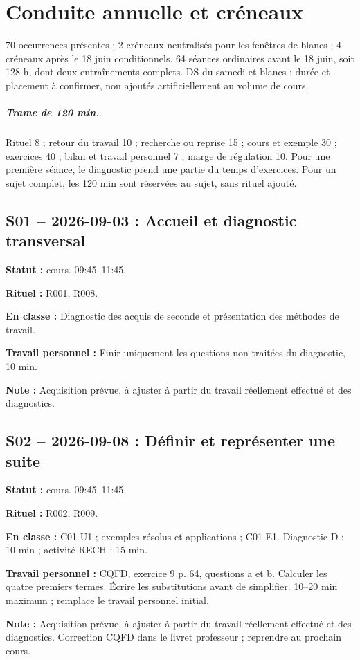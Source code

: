 \chapter{Conduite annuelle et créneaux}\label{ANNUEL}
70 occurrences présentes ; 2 créneaux neutralisés pour les fenêtres de blancs ; 4 créneaux après le 18 juin conditionnels. 64 séances ordinaires avant le 18 juin, soit 128 h, dont deux entraînements complets. DS du samedi et blancs : durée et placement à confirmer, non ajoutés artificiellement au volume de cours.
\paragraph{Trame de 120 min.} Rituel 8 ; retour du travail 10 ; recherche ou reprise 15 ; cours et exemple 30 ; exercices 40 ; bilan et travail personnel 7 ; marge de régulation 10. Pour une première séance, le diagnostic prend une partie du temps d’exercices. Pour un sujet complet, les 120 min sont réservées au sujet, sans rituel ajouté.
\section*{S01 -- 2026-09-03 : Accueil et diagnostic transversal}
\textbf{Statut :} cours. 09:45–11:45.\par\textbf{Rituel :} R001, R008.\par\textbf{En classe :} Diagnostic des acquis de seconde et présentation des méthodes de travail.\par\textbf{Travail personnel :} Finir uniquement les questions non traitées du diagnostic, 10 min.\par\textbf{Note :} Acquisition prévue, à ajuster à partir du travail réellement effectué et des diagnostics.
\section*{S02 -- 2026-09-08 : Définir et représenter une suite}
\textbf{Statut :} cours. 09:45–11:45.\par\textbf{Rituel :} R002, R009.\par\textbf{En classe :} C01-U1 ; exemples résolus et applications ; C01-E1. Diagnostic D : 10 min ; activité RECH : 15 min.\par\textbf{Travail personnel :} CQFD, exercice 9 p. 64, questions a et b. Calculer les quatre premiers termes. Écrire les substitutions avant de simplifier. 10–20 min maximum ; remplace le travail personnel initial.\par\textbf{Note :} Acquisition prévue, à ajuster à partir du travail réellement effectué et des diagnostics. Correction CQFD dans le livret professeur ; reprendre au prochain cours.
